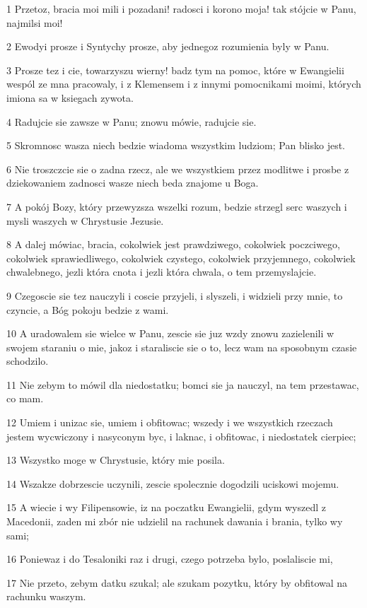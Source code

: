 \par 1 Przetoz, bracia moi mili i pozadani! radosci i korono moja! tak stójcie w Panu, najmilsi moi!
\par 2 Ewodyi prosze i Syntychy prosze, aby jednegoz rozumienia byly w Panu.
\par 3 Prosze tez i cie, towarzyszu wierny! badz tym na pomoc, które w Ewangielii wespól ze mna pracowaly, i z Klemensem i z innymi pomocnikami moimi, których imiona sa w ksiegach zywota.
\par 4 Radujcie sie zawsze w Panu; znowu mówie, radujcie sie.
\par 5 Skromnosc wasza niech bedzie wiadoma wszystkim ludziom; Pan blisko jest.
\par 6 Nie troszczcie sie o zadna rzecz, ale we wszystkiem przez modlitwe i prosbe z dziekowaniem zadnosci wasze niech beda znajome u Boga.
\par 7 A pokój Bozy, który przewyzsza wszelki rozum, bedzie strzegl serc waszych i mysli waszych w Chrystusie Jezusie.
\par 8 A dalej mówiac, bracia, cokolwiek jest prawdziwego, cokolwiek poczciwego, cokolwiek sprawiedliwego, cokolwiek czystego, cokolwiek przyjemnego, cokolwiek chwalebnego, jezli która cnota i jezli która chwala, o tem przemyslajcie.
\par 9 Czegoscie sie tez nauczyli i coscie przyjeli, i slyszeli, i widzieli przy mnie, to czyncie, a Bóg pokoju bedzie z wami.
\par 10 A uradowalem sie wielce w Panu, zescie sie juz wzdy znowu zazielenili w swojem staraniu o mie, jakoz i staraliscie sie o to, lecz wam na sposobnym czasie schodzilo.
\par 11 Nie zebym to mówil dla niedostatku; bomci sie ja nauczyl, na tem przestawac, co mam.
\par 12 Umiem i unizac sie, umiem i obfitowac; wszedy i we wszystkich rzeczach jestem wycwiczony i nasyconym byc, i laknac, i obfitowac, i niedostatek cierpiec;
\par 13 Wszystko moge w Chrystusie, który mie posila.
\par 14 Wszakze dobrzescie uczynili, zescie spolecznie dogodzili uciskowi mojemu.
\par 15 A wiecie i wy Filipensowie, iz na poczatku Ewangielii, gdym wyszedl z Macedonii, zaden mi zbór nie udzielil na rachunek dawania i brania, tylko wy sami;
\par 16 Poniewaz i do Tesaloniki raz i drugi, czego potrzeba bylo, poslaliscie mi,
\par 17 Nie przeto, zebym datku szukal; ale szukam pozytku, który by obfitowal na rachunku waszym.
